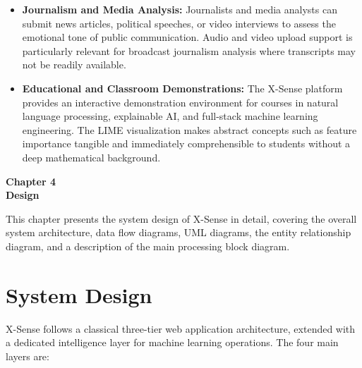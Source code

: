 \documentclass[12pt, a4paper]{report}
\begin{document}
\begin{itemize}[noitemsep, leftmargin=1.5em]
    \item \textbf{Journalism and Media Analysis:} Journalists and media analysts can submit news articles, political speeches, or video interviews to assess the emotional tone of public communication. Audio and video upload support is particularly relevant for broadcast journalism analysis where transcripts may not be readily available.

    \item \textbf{Educational and Classroom Demonstrations:} The X-Sense platform provides an interactive demonstration environment for courses in natural language processing, explainable AI, and full-stack machine learning engineering. The LIME visualization makes abstract concepts such as feature importance tangible and immediately comprehensible to students without a deep mathematical background.
\end{itemize}

\newpage
\thispagestyle{empty}

\vspace*{\fill}
\begin{center}
{\Huge \textbf{Chapter 4}}\\[1cm]
{\Huge \textbf{Design}}
\end{center}
\vspace*{\fill}

\newpage

This chapter presents the system design of X-Sense in detail, covering the overall system architecture, data flow diagrams, UML diagrams, the entity relationship diagram, and a description of the main processing block diagram.

\section{System Design}

X-Sense follows a classical three-tier web application architecture, extended with a dedicated intelligence layer for machine learning operations. The four main layers are:
\end{document}
